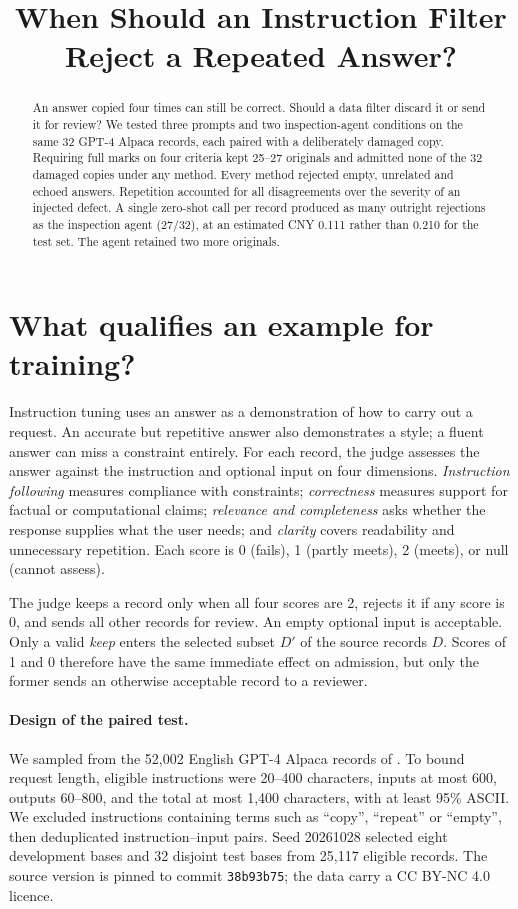 \documentclass{article}
\title{When Should an Instruction Filter Reject a Repeated Answer?}
\begin{document}
\maketitle
{}
\begin{abstract}
An answer copied four times can still be correct. Should a data filter discard it or send it for review? We tested three prompts and two inspection-agent conditions on the same 32 GPT-4 Alpaca records, each paired with a deliberately damaged copy. Requiring full marks on four criteria kept 25--27 originals and admitted none of the 32 damaged copies under any method. Every method rejected empty, unrelated and echoed answers. Repetition accounted for all disagreements over the severity of an injected defect. A single zero-shot call per record produced as many outright rejections as the inspection agent (27/32), at an estimated CNY 0.111 rather than 0.210 for the test set. The agent retained two more originals.
\end{abstract}

\section{What qualifies an example for training?}
Instruction tuning uses an answer as a demonstration of how to carry out a request. An accurate but repetitive answer also demonstrates a style; a fluent answer can miss a constraint entirely. For each record, the judge assesses the answer against the instruction and optional input on four dimensions. \emph{Instruction following} measures compliance with constraints; \emph{correctness} measures support for factual or computational claims; \emph{relevance and completeness} asks whether the response supplies what the user needs; and \emph{clarity} covers readability and unnecessary repetition. Each score is 0 (fails), 1 (partly meets), 2 (meets), or null (cannot assess).

The judge keeps a record only when all four scores are 2, rejects it if any score is 0, and sends all other records for review. An empty optional input is acceptable. Only a valid \textit{keep} enters the selected subset $D'$ of the source records $D$. Scores of 1 and 0 therefore have the same immediate effect on admission, but only the former sends an otherwise acceptable record to a reviewer.

\paragraph{Design of the paired test.}
We sampled from the 52,002 English GPT-4 Alpaca records of \citet{peng2023}. To bound request length, eligible instructions were 20--400 characters, inputs at most 600, outputs 60--800, and the total at most 1,400 characters, with at least 95\% ASCII. We excluded instructions containing terms such as “copy”, “repeat” or “empty”, then deduplicated instruction--input pairs. Seed 20261028 selected eight development bases and 32 disjoint test bases from 25,117 eligible records. The source version is pinned to commit \texttt{38b93b75}; the data carry a CC BY-NC 4.0 licence.
\end{document}
